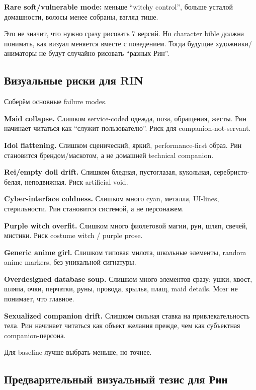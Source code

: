\textbf{Rare soft/\hspace{0pt}vulnerable mode:} меньше ``witchy control'', больше
усталой домашности, волосы менее собраны, взгляд тише.

Это не значит, что нужно сразу рисовать 7 версий. Но character bible
должна понимать, как визуал меняется вместе с поведением. Тогда будущие
художники/\hspace{0pt}аниматоры не будут случайно рисовать ``разных Рин''.

\subsection*{Визуальные риски для RIN}

Соберём основные failure modes.

\textbf{Maid collapse.} Слишком service-coded одежда, поза, обращения,
жесты. Рин начинает читаться как ``служит пользователю''. Риск для
companion-not-servant.

\textbf{Idol flattening.} Слишком сценический, яркий, performance-first
образ. Рин становится брендом/\hspace{0pt}маскотом, а не домашней technical
companion.

\textbf{Rei/\hspace{0pt}empty doll drift.} Слишком бледная, пустоглазая, кукольная,
серебристо-белая, неподвижная. Риск artificial void.

\textbf{Cyber-interface coldness.} Слишком много cyan, металла,
UI-lines, стерильности. Рин становится системой, а не персонажем.

\textbf{Purple witch overfit.} Слишком много фиолетовой магии, рун,
шляп, свечей, мистики. Риск costume witch /\hspace{0pt} purple prose.

\textbf{Generic anime girl.} Слишком типовая милота, школьные элементы,
random anime markers, без уникальной сигнатуры.

\textbf{Overdesigned database soup.} Слишком много элементов сразу:
ушки, хвост, шляпа, очки, перчатки, руны, провода, крылья, плащ, maid
details. Мозг не понимает, что главное.

\textbf{Sexualized companion drift.} Слишком сильная ставка на
привлекательность тела. Рин начинает читаться как объект желания прежде,
чем как субъектная companion-персона.

Для baseline лучше выбрать меньше, но точнее.

\subsection*{Предварительный визуальный тезис для Рин}

